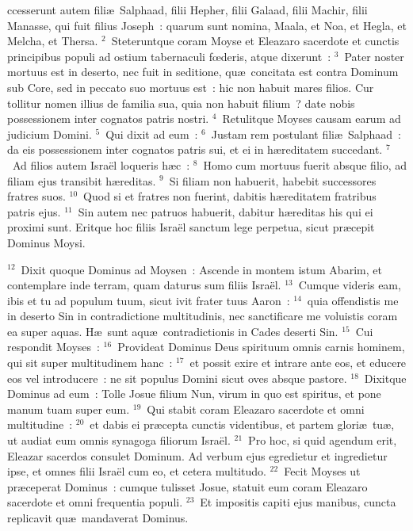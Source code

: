 \bchapter
{}ccesserunt autem fili\ae\ Salphaad, filii Hepher, filii Galaad, filii Machir, filii Manasse, qui fuit filius Joseph~: quarum sunt nomina, Maala, et Noa, et Hegla, et Melcha, et Thersa.
${}^{2}$~Steteruntque coram Moyse et Eleazaro sacerdote et cunctis principibus populi ad ostium tabernaculi fœderis, atque dixerunt~:
${}^{3}$~Pater noster mortuus est in deserto, nec fuit in seditione, qu\ae\ concitata est contra Dominum sub Core, sed in peccato suo mortuus est~: hic non habuit mares filios. Cur tollitur nomen illius de familia sua, quia non habuit filium~? date nobis possessionem inter cognatos patris nostri.
${}^{4}$~Retulitque Moyses causam earum ad judicium Domini.
${}^{5}$~Qui dixit ad eum~:
${}^{6}$~Justam rem postulant fili\ae\ Salphaad~: da eis possessionem inter cognatos patris sui, et ei in h\ae reditatem succedant.
${}^{7}$~Ad filios autem Isra\"el loqueris h\ae c~:
${}^{8}$~Homo cum mortuus fuerit absque filio, ad filiam ejus transibit h\ae reditas.
${}^{9}$~Si filiam non habuerit, habebit successores fratres suos.
${}^{10}$~Quod si et fratres non fuerint, dabitis h\ae reditatem fratribus patris ejus.
${}^{11}$~Sin autem nec patruos habuerit, dabitur h\ae reditas his qui ei proximi sunt. Eritque hoc filiis Isra\"el sanctum lege perpetua, sicut pr\ae cepit Dominus Moysi.


${}^{12}$~Dixit quoque Dominus ad Moysen~: Ascende in montem istum Abarim, et contemplare inde terram, quam daturus sum filiis Isra\"el.
${}^{13}$~Cumque videris eam, ibis et tu ad populum tuum, sicut ivit frater tuus Aaron~:
${}^{14}$~quia offendistis me in deserto Sin in contradictione multitudinis, nec sanctificare me voluistis coram ea super aquas. H\ae\ sunt aqu\ae\ contradictionis in Cades deserti Sin.
${}^{15}$~Cui respondit Moyses~:
${}^{16}$~Provideat Dominus Deus spirituum omnis carnis hominem, qui sit super multitudinem hanc~:
${}^{17}$~et possit exire et intrare ante eos, et educere eos vel introducere~: ne sit populus Domini sicut oves absque pastore.
${}^{18}$~Dixitque Dominus ad eum~: Tolle Josue filium Nun, virum in quo est spiritus, et pone manum tuam super eum.
${}^{19}$~Qui stabit coram Eleazaro sacerdote et omni multitudine~:
${}^{20}$~et dabis ei pr\ae cepta cunctis videntibus, et partem glori\ae\ tu\ae , ut audiat eum omnis synagoga filiorum Isra\"el.
${}^{21}$~Pro hoc, si quid agendum erit, Eleazar sacerdos consulet Dominum. Ad verbum ejus egredietur et ingredietur ipse, et omnes filii Isra\"el cum eo, et cetera multitudo.
${}^{22}$~Fecit Moyses ut pr\ae ceperat Dominus~: cumque tulisset Josue, statuit eum coram Eleazaro sacerdote et omni frequentia populi.
${}^{23}$~Et impositis capiti ejus manibus, cuncta replicavit qu\ae\ mandaverat Dominus.


